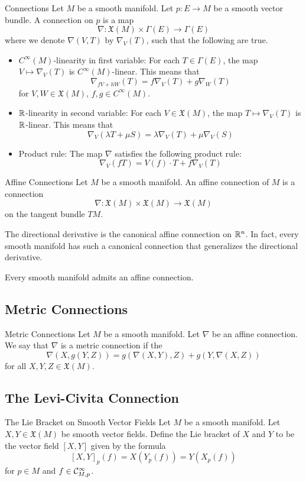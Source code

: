 \documentclass[a4paper]{article}
\begin{document}
\begin{defn}{Connections}{} Let $M$ be a smooth manifold. Let $p:E\to M$ be a smooth vector bundle. A connection on $p$ is a map $$\nabla:\mathfrak{X}(M)\times\Gamma(E)\to\Gamma(E)$$ where we denote $\nabla(V,T)$ by $\nabla_V(T)$, such that the following are true. 
\begin{itemize}
\item $C^\infty(M)$-linearity in first variable: For each $T\in\Gamma(E)$, the map $V\mapsto\nabla_V(T)$ is $C^\infty(M)$-linear. This means that $$\nabla_{fV+hW}(T)=f\nabla_V(T)+g\nabla_W(T)$$ for $V,W\in\mathfrak{X}(M)$, $f,g\in C^\infty(M)$. 
\item $\mathbb{R}$-linearity in second variable: For each $V\in\mathfrak{X}(M)$, the map $T\mapsto\nabla_V(T)$ is $\mathbb{R}$-linear. This means that $$\nabla_V(\lambda T+\mu S)=\lambda\nabla_V(T)+\mu\nabla_V(S)$$
\item Product rule: The map $\nabla$ satisfies the following product rule: $$\nabla_V(fT)=V(f)\cdot T+f\nabla_V(T)$$
\end{itemize}
\end{defn}

\begin{defn}{Affine Connections}{} Let $M$ be a smooth manifold. An affine connection of $M$ is a connection $$\nabla:\mathfrak{X}(M)\times\mathfrak{X}(M)\to\mathfrak{X}(M)$$ on the tangent bundle $TM$. 
\end{defn}

The directional derivative is the canonical affine connection on $\mathbb{R}^n$. In fact, every smooth manifold has such a canonical connection that generalizes the directional derivative. 

\begin{thm}{}{} Every smooth manifold admits an affine connection. 
\end{thm}

\subsection{Metric Connections}
\begin{defn}{Metric Connections}{} Let $M$ be a smooth manifold. Let $\nabla$ be an affine connection. We say that $\nabla$ is a metric connection if the $$\nabla(X,g(Y,Z))=g(\nabla(X,Y),Z)+g(Y,\nabla(X,Z))$$ for all $X,Y,Z\in\mathfrak{X}(M)$. 
\end{defn}

\subsection{The Levi-Civita Connection}
\begin{defn}{The Lie Bracket on Smooth Vector Fields}{} Let $M$ be a smooth manifold. Let $X,Y\in\mathfrak{X}(M)$ be smooth vector fields. Define the Lie bracket of $X$ and $Y$ to be the vector field $[X,Y]$ given by the formula $$[X,Y]_p(f)=X(Y_p(f))=Y(X_p(f))$$ for $p\in M$ and $f\in\mathcal{C}_{M,p}^\infty$. 
\end{defn}
\end{document}

